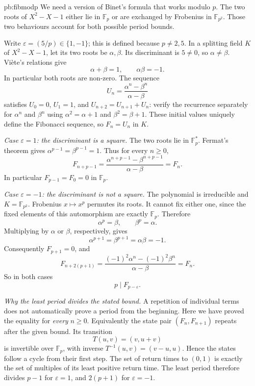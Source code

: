 \begin{solution}{pb:fibmodp}
\idea We need a version of Binet's formula that works modulo $p$. The two roots of $X^2-X-1$ either lie in $\mathbb F_p$ or are exchanged by Frobenius in $\mathbb F_{p^2}$. Those two behaviours account for both possible period bounds.

\writeup Write $\varepsilon=(5/p)\in\{1,-1\}$; this is defined because $p\ne2,5$. In a splitting field $K$ of $X^2-X-1$, let its two roots be $\alpha,\beta$. Its discriminant is $5\ne0$, so $\alpha\ne\beta$. Viète's relations give
\[
\alpha+\beta=1,\qquad \alpha\beta=-1.
\]
In particular both roots are non-zero. The sequence
\[
U_n=\frac{\alpha^n-\beta^n}{\alpha-\beta}
\]
satisfies $U_0=0$, $U_1=1$, and $U_{n+2}=U_{n+1}+U_n$: verify the recurrence separately for $\alpha^n$ and $\beta^n$ using $\alpha^2=\alpha+1$ and $\beta^2=\beta+1$. These initial values uniquely define the Fibonacci sequence, so $F_n=U_n$ in $K$.

\emph{Case $\varepsilon=1$: the discriminant is a square.}
The two roots lie in $\mathbb F_p^*$. Fermat's theorem gives $\alpha^{p-1}=\beta^{p-1}=1$. Thus for every $n\ge0$,
\[
F_{n+p-1}=\frac{\alpha^{n+p-1}-\beta^{n+p-1}}
                  {\alpha-\beta}=F_n.
\]
In particular $F_{p-1}=F_0=0$ in $\mathbb F_p$.

\emph{Case $\varepsilon=-1$: the discriminant is not a square.}
The polynomial is irreducible and $K=\mathbb F_{p^2}$. Frobenius $x\mapsto x^p$ permutes its roots. It cannot fix either one, since the fixed elements of this automorphism are exactly $\mathbb F_p$. Therefore
\[
\alpha^p=\beta,\qquad\beta^p=\alpha.
\]
Multiplying by $\alpha$ or $\beta$, respectively, gives
\[
\alpha^{p+1}=\beta^{p+1}=\alpha\beta=-1.
\]
Consequently $F_{p+1}=0$, and
\[
F_{n+2(p+1)}
=\frac{(-1)^2\alpha^n-(-1)^2\beta^n}{\alpha-\beta}
=F_n.
\]
So in both cases
\[
\boxed{p\mid F_{p-\varepsilon}}.
\]

\emph{Why the least period divides the stated bound.}
A repetition of individual terms does not automatically prove a period from the beginning. Here we have proved the equality for \emph{every} $n\ge0$. Equivalently the state pair $(F_n,F_{n+1})$ repeats after the given bound. Its transition
\[
T(u,v)=(v,u+v)
\]
is invertible over $\mathbb F_p$, with inverse $T^{-1}(u,v)=(v-u,u)$. Hence the states follow a cycle from their first step. The set of return times to $(0,1)$ is exactly the set of multiples of its least positive return time. The least period therefore divides $p-1$ for $\varepsilon=1$, and $2(p+1)$ for $\varepsilon=-1$.


\end{solution}
